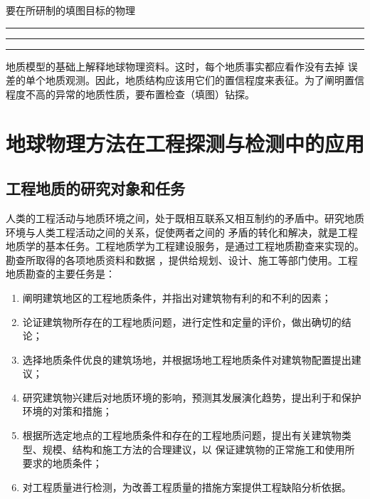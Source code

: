 \documentclass[hyperref,UTF-8]{ctexart}
\newcommand{\cndash}{\rule{0.2em}{0pt}\rule[0.35em]{1.6em}{0.05em}\rule{0.2em}{0pt}}
\begin{document}
要在所研制的填图目标的物理\cndash 地质模型的基础上解释地球物理资料。这时，每个地质事实都应看作没有去掉
误差的单个地质观测。因此，地质结构应该用它们的置信程度来表征。为了阐明置信程度不高的异常的地质性质，要布置检查（填图）钻探。
\section{地球物理方法在工程探测与检测中的应用}
\subsection{工程地质的研究对象和任务}
人类的工程活动与地质环境之间，处于既相互联系又相互制约的矛盾中。研究地质环境与人类工程活动之间的关系，促使两者之间的
矛盾的转化和解决，就是工程地质学的基本任务。工程地质学为工程建设服务，是通过工程地质勘查来实现的。勘查所取得的各项地质资料和数据
，提供给规划、设计、施工等部门使用。工程地质勘查的主要任务是：
\begin{enumerate}
\item 阐明建筑地区的工程地质条件，并指出对建筑物有利的和不利的因素；
\item 论证建筑物所存在的工程地质问题，进行定性和定量的评价，做出确切的结论；
\item 选择地质条件优良的建筑场地，并根据场地工程地质条件对建筑物配置提出建议；
\item 研究建筑物兴建后对地质环境的影响，预测其发展演化趋势，提出利于和保护环境的对策和措施；
\item 根据所选定地点的工程地质条件和存在的工程地质问题，提出有关建筑物类型、规模、结构和施工方法的合理建议，以
保证建筑物的正常施工和使用所要求的地质条件；
\item 对工程质量进行检测，为改善工程质量的措施方案提供工程缺陷分析依据。
\end{enumerate}
\end{document}

